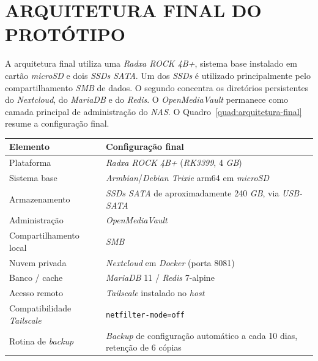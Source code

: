 \section{ARQUITETURA FINAL DO PROTÓTIPO}

A arquitetura final utiliza uma \textit{Radxa ROCK 4B+}, sistema base instalado em cartão \textit{microSD} e dois \textit{SSDs SATA}. Um dos \textit{SSDs} é utilizado principalmente pelo compartilhamento \textit{SMB} de dados. O segundo concentra os diretórios persistentes do \textit{Nextcloud}, do \textit{MariaDB} e do \textit{Redis}. O \textit{OpenMediaVault} permanece como camada principal de administração do \textit{NAS}. O Quadro~\ref{quad:arquitetura-final} resume a configuração final.

\begin{quadro}[H]
    \centering
    \small
    \begin{tabularx}{\linewidth}{|>{\raggedright\arraybackslash}X|>{\raggedright\arraybackslash}X|}
        \hline
        \textbf{Elemento} & \textbf{Configuração final} \\
        \hline
        \hline
        Plataforma & \textit{Radxa ROCK 4B+} (\textit{RK3399}, 4 \textit{GB}) \\
        \hline
        Sistema base & \textit{Armbian}/\textit{Debian Trixie} arm64 em \textit{microSD} \\
        \hline
        Armazenamento & 2 \textit{SSDs SATA} de aproximadamente 240 \textit{GB}, via \textit{USB-SATA} \\
        \hline
        Administração & \textit{OpenMediaVault} \\
        \hline
        Compartilhamento local & \textit{SMB} \\
        \hline
        Nuvem privada & \textit{Nextcloud} em \textit{Docker} (porta 8081) \\
        \hline
        Banco / cache & \textit{MariaDB} 11 / \textit{Redis} 7-alpine \\
        \hline
        Acesso remoto & \textit{Tailscale} instalado no \textit{host} \\
        \hline
        Compatibilidade \textit{Tailscale} & \texttt{netfilter-mode=off} \\
        \hline
        Rotina de \textit{backup} & \textit{Backup} de configuração automático a cada 10 dias, retenção de 6 cópias \\
        \hline
    \end{tabularx}
    \vspace{0.2cm}
    \fonteautoria
\end{quadro}

